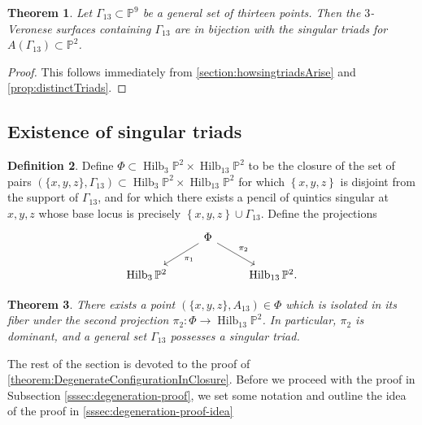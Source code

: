 \documentclass[reqno, 11pt]{amsart}
\theoremstyle{definition}
\theoremstyle{remark}
\numberwithin{equation}{section}
\numberwithin{thm}{section}
\numberwithin{prop}{section}
\numberwithin{lem}{section}
\numberwithin{cor}{section}
\numberwithin{conj}{section}
\numberwithin{defn}{section}
\renewcommand{\to}{\longrightarrow}
\newcommand {\from}{{\colon}}
\theoremstyle{plain}
\newtheorem{theorem}{Theorem}[section]
\theoremstyle{definition}
\newtheorem{definition}[theorem]{Definition}
\newcommand\bp{{\mathbb P}}
\DeclareMathOperator\Hilb{Hilb}
\begin{document}
\begin{theorem}\label{thm:bijectionTriadsVeronese}
Let $\Gamma_{13} \subset \bp^{9}$ be a general set of thirteen points.  Then the $3$-Veronese surfaces containing $\Gamma_{13}$ are in bijection with the singular triads for $A(\Gamma_{13}) \subset \bp^{2}$.
\end{theorem}

\begin{proof}
This follows immediately from \autoref{section:howsingtriadsArise} and \autoref{prop:distinctTriads}.
\end{proof}

\subsection{Existence of singular triads}
\label{ssec:existence-of-singular-triads}





\begin{definition}
Define $\Phi \subset \Hilb_{3}\bp^{2} \times \Hilb_{13}\bp^{2}$ to be the closure of the set of 
pairs 
$(\{x,y,z\}, \Gamma_{13}) \subset \Hilb_3\bp^2 \times \Hilb_{13} \bp^2$ for which $\left\{ x, y, z \right\}$ is disjoint from the support of $\Gamma_{13}$, and for which there exists a pencil of quintics singular at $x,y,z$ whose base locus is precisely $\left\{ x,y,z \right\} \cup \Gamma_{13}$. 
Define the projections
\begin{equation}
	\nonumber
	\begin{tikzcd}
		\qquad & \Phi \ar {ld}{\pi_1} \ar {rd}{\pi_2} & \\
		\Hilb_3 \bp^2 && \Hilb_{13} \bp^2.
	 \end{tikzcd}\end{equation}
\end{definition}



\begin{theorem}\label{theorem:DegenerateConfigurationInClosure} There exists a point $(\{x,y,z\}, A_{13}) \in \Phi$ which is isolated in its fiber under the second projection $\pi_{2} \from \Phi \to \Hilb_{13}\bp^{2}$. In particular, $\pi_{2}$ is dominant, and a general set $\Gamma_{13}$ possesses a singular triad.
\end{theorem} 


The rest of the section is devoted to the proof of \autoref{theorem:DegenerateConfigurationInClosure}.  Before we proceed with the proof in Subsection \ref{sssec:degeneration-proof}, we set some notation and outline the idea of the proof in
\ref{sssec:degeneration-proof-idea}
\end{document}
